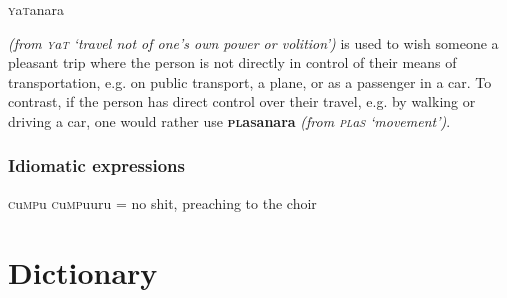 \documentclass[a4paper,10pt,twoside,openright]{memoir}
\newcommand{\famword}[5]{#1\textsc{#2}#3\textsc{#4}#5}
\begin{document}
\subparagraph{\famword{}{y}{a}{t}{anara}} \textit{(from \famword{}{y}{a}{t}{} `travel not of one's own power or volition')} is used to wish someone a pleasant trip where the person is not directly in control of their means of transportation, e.g. on public transport, a plane, or as a passenger in a car. To contrast, if the person has direct control over their travel, e.g. by walking or driving a car, one would rather use \textbf{\famword{}{pl}{a}{s}{anara}} \textit{(from \famword{}{pl}{a}{s}{} `movement')}.

\section{Idiomatic expressions}

\famword{}{c}{u}{mp}{u} \famword{}{c}{u}{mp}{uuru} = no shit, preaching to the choir

\part{Dictionary}

\end{document}
